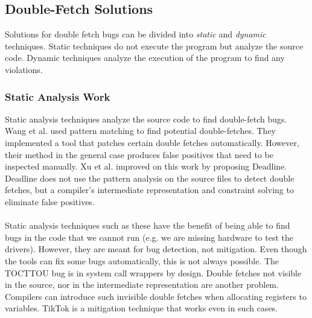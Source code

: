 \subsection{Double-Fetch Solutions}

Solutions for double fetch bugs can be divided into \emph{static} and
\emph{dynamic} techniques. Static techniques do not execute the program but
analyze the source code. Dynamic techniques analyze the execution of the
program to find any violations.

\subsubsection{Static Analysis Work}
\label{subsec:dfstatic}
Static analysis techniques analyze the source code to find double-fetch bugs.
Wang et al. \cite{wang2017double} used pattern matching to find potential
double-fetches. They implemented a tool that patches certain double fetches
automatically. However, their method in the general case produces false
positives that need to be inspected manually. Xu et al.\cite{xu2018precise}
improved on this work by proposing Deadline. Deadline does not use the pattern 
analysis on the source files to detect double fetches, but a compiler's
intermediate representation and constraint solving to eliminate false positives.
\\
\\
Static analysis techniques such as these have the benefit of being able to find
bugs in the code that we cannot run (e.g. we are missing hardware to test the
drivers). However, they are meant for bug detection, not mitigation. Even though
the tools can fix some bugs automatically, this is not always possible. The
TOCTTOU bug is in system call wrappers by design. Double fetches not visible in
the source, nor in the intermediate representation are another problem.
Compilers can introduce such invisible double fetches when allocating registers
to variables. TikTok is a mitigation technique that works even in such cases.
\\
\\

